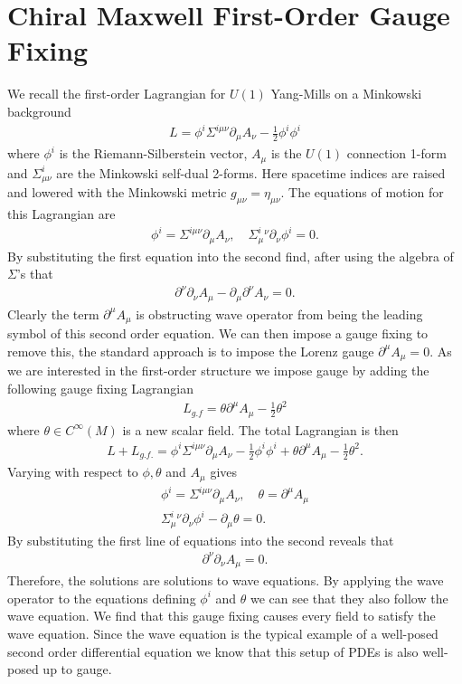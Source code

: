 \documentclass[10pt]{report}
\theoremstyle{definition}
\begin{document}
\section{Chiral Maxwell First-Order Gauge Fixing}\label{sec:first-order-maxwell-gauge-fixing}
We recall the first-order Lagrangian for $U(1)$ Yang-Mills on a Minkowski background
\begin{align}
    L = \phi^i \Sigma^{i\mu\nu} \partial_\mu A_\nu - \frac{1}{2} \phi^i \phi^i
\end{align}
where $\phi^i$ is the Riemann-Silberstein vector, $A_\mu$ is the $U(1)$ connection 1-form and $\Sigma^i_{\mu\nu}$ are the Minkowski self-dual 2-forms. Here spacetime indices are raised and lowered with the Minkowski metric $g_{\mu\nu} = \eta_{\mu\nu}$. The equations of motion for this Lagrangian are
\begin{align}
    \phi^i = \Sigma^{i\mu\nu} \partial_\mu A_{\nu}, \quad \Sigma^i_\mu{}^\nu \partial_\nu \phi^i = 0.
\end{align}
By substituting the first equation into the second find, after using the algebra of $\Sigma$'s that
\begin{align}
    \partial^\nu \partial_\nu A_\mu - \partial_\mu \partial^\nu A_\nu = 0.
\end{align}
Clearly the term $\partial^\mu A_\mu$ is obstructing wave operator from being the leading symbol of this second order equation. We can then impose a gauge fixing to remove this, the standard approach is to impose the Lorenz gauge $\partial^\mu A_\mu = 0$. As we are interested in the first-order structure we impose gauge by adding the following gauge fixing Lagrangian
\begin{align}
    L_{g.f} = \theta \partial^\mu A_\mu - \frac{1}{2} \theta^2
\end{align}
where $\theta \in C^\infty(M)$ is a new scalar field. The total Lagrangian is then 
\begin{align}
    L + L_{g.f.} = \phi^i \Sigma^{i\mu\nu} \partial_\mu A_\nu - \frac{1}{2} \phi^i \phi^i + \theta \partial^\mu A_\mu - \frac{1}{2} \theta^2.
\end{align}
Varying with respect to $\phi,\theta$ and $A_\mu$ gives 
\begin{align}
    \phi^i = \Sigma^{i\mu\nu} \partial_\mu A_\nu, \quad \theta = \partial^\mu A_\mu \label{eq:lin-maxwell-modified-phi-theta-definition} \\
    \Sigma^i_\mu{}^\nu \partial_\nu \phi^i - \partial_\mu \theta = 0. \label{eq:lin-maxwell-modified-evolution-equations}
\end{align} 
By substituting the first line of equations into the second reveals that 
\begin{align}
    \partial^\nu \partial_\nu A_\mu = 0.
\end{align}
Therefore, the solutions are solutions to wave equations. By applying the wave operator to the equations defining $\phi^i$ and $\theta$ we can see that they also follow the wave equation. We find that this gauge fixing causes every field to satisfy the wave equation. Since the wave equation is the typical example of a well-posed second order differential equation we know that this setup of PDEs is also well-posed up to gauge.
\end{document}
